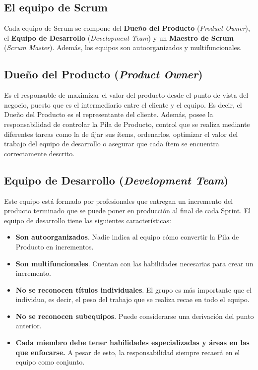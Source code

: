 \newpage

\subsection{El equipo de Scrum}
Cada equipo de Scrum \cite{Schwaber2017} se compone del \textbf{Dueño del Producto} (\textit{Product Owner}), el \textbf{Equipo de Desarrollo} (\textit{Development Team}) y un \textbf{Maestro de Scrum} (\textit{Scrum Master}). Además, los equipos son autoorganizados y multifuncionales.

\subsection*{Dueño del Producto (\textit{Product Owner})}
Es el responsable de maximizar el valor del producto desde el punto de vista del negocio, puesto que es el intermediario entre el cliente y el equipo. Es decir, el Dueño del Producto es el representante del cliente. Además, posee la responsabilidad de controlar la Pila de Producto, control que se realiza mediante diferentes tareas como la de fijar sus ítems, ordenarlos, optimizar el valor del trabajo del equipo de desarrollo o asegurar que cada ítem se encuentra correctamente descrito.

\subsection*{Equipo de Desarrollo (\textit{Development Team})}
Este equipo está formado por profesionales que entregan un incremento del producto terminado que se puede poner en producción al final de cada Sprint. El equipo de desarrollo tiene las siguientes características:

\begin{itemize}
	\item \textbf{Son autoorganizados}. Nadie indica al equipo cómo convertir la Pila de Producto en incrementos.
	\item \textbf{Son multifuncionales}. Cuentan con las habilidades necesarias para crear un incremento.
	\item \textbf{No se reconocen títulos individuales}. El grupo es más importante que el individuo, es decir, el peso del trabajo que se realiza recae en todo el equipo.
	\item \textbf{No se reconocen subequipos}. Puede considerarse una derivación del punto anterior.
	\item \textbf{Cada miembro debe tener habilidades especializadas y áreas en las que enfocarse.} A pesar de esto, la responsabilidad siempre recaerá en el equipo como conjunto.
\end{itemize}


